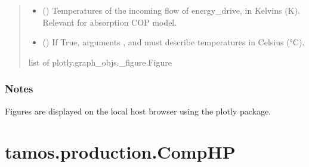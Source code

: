 \documentclass[letterpaper,10pt,english]{sphinxmanual}
\begin{document}
\begin{fulllineitems}
\begin{fulllineitems}
\begin{quote}
\begin{description}
\begin{itemize}
\item {} 
\sphinxAtStartPar
{} (\sphinxstyleliteralemphasis{\sphinxupquote{, }}\sphinxstyleliteralemphasis{\sphinxupquote{, }}\sphinxstyleliteralemphasis{\sphinxupquote{(}}\sphinxstyleliteralemphasis{\sphinxupquote{, }}\sphinxstyleliteralemphasis{\sphinxupquote{, }}\sphinxstyleliteralemphasis{\sphinxupquote{)}}) \textendash{} Temperatures of the incoming flow of energy\_drive, in Kelvins (K).
Relevant for absorption COP model.

\item {} 
\sphinxAtStartPar
{} (\sphinxstyleliteralemphasis{\sphinxupquote{, }}\sphinxstyleliteralemphasis{\sphinxupquote{, }}) \textendash{} If True, arguments ,  and  must describe temperatures in Celsius (°C).

\end{itemize}

\sphinxAtStartPar
{}

\sphinxAtStartPar
list of plotly.graph\_objs.\_figure.Figure

\end{description}\end{quote}
\subsubsection*{Notes}

\sphinxAtStartPar
Figures are displayed on the local host browser using the plotly package.

\end{fulllineitems}


\end{fulllineitems}


\sphinxstepscope


\section{tamos.production.CompHP}
\label{\detokenize{generated/tamos.production.CompHP:tamos-production-comphp}}\label{\detokenize{generated/tamos.production.CompHP::doc}}
\end{document}
